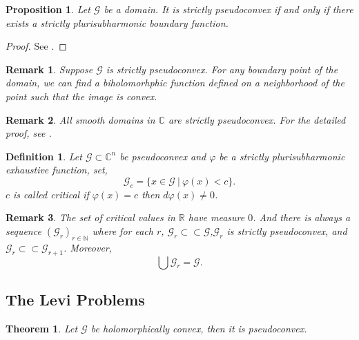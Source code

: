 \documentclass{article}
\newtheorem{theorem}{Theorem} [section]
\newtheorem{proposition}{Proposition}[section]
\newtheorem{definition}{Definition}[section]
\newtheorem{remark}{Remark}[section]
\newcommand{\N}[0]{\mathbb{N}}
\newcommand{\R}[0]{\mathbb{R}}
\newcommand{\C}[0]{\mathbb{C}}
\newcommand{\G}[0]{\mathcal{G}}
\newcommand{\sep}[0]{\:|\:}
\newcommand{\compembed}[0]{\subset\subset}
\begin{document}
\begin{proposition}
  Let $\G$ be a domain. It is strictly pseudoconvex if and only if there exists a strictly plurisubharmonic boundary function.
\end{proposition}

\begin{proof}
  See \cite{Ra}.
\end{proof}

\begin{remark}
  Suppose $\G$ is strictly pseudoconvex. For any boundary point of the domain, we can find a biholomorhphic function defined on a neighborhood of the point such that the image is convex.
\end{remark}

\begin{remark}
  All smooth domains in $\C$ are strictly pseudoconvex. For the detailed proof, see \cite{LiM}.
\end{remark}

\begin{definition}
  Let $\G\subset\C^n$ be pseudoconvex and $\varphi$ be a strictly plurisubharmonic exhaustive function, set,
  \begin{equation*}
    \G_c = \{x\in\G\sep \varphi(x)<c\}.
  \end{equation*}
  $c$ is called critical if $\varphi(x) = c$ then $d\varphi(x) \not=0$. 
\end{definition}

\begin{remark}
  The set of critical values in $\R$ have measure $0$. And there is always a sequence $(\G_r)_{r\in\N}$ where for each $r$, $\G_r \compembed\G$,$\G_r$ is strictly pseudoconvex, and $\G_r\compembed\G_{r+1}$. Moreover,
  \begin{equation*}
    \bigcup\G_{r} = \G.
  \end{equation*}
\end{remark}

\subsection{The Levi Problems}

\begin{theorem}
  Let $\G$ be holomorphically convex, then it is pseudoconvex.
\end{theorem}
\end{document}
